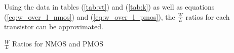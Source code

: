 \FloatBarrier

Using the data in tables (\ref{tab:vt}) and (\ref{tab:k}) as well as equations (\ref{eq:w_over_l_nmos}) and (\ref{eq:w_over_l_pmos}), the $\frac{W}{L}$ ratios for each transistor can be approximated.

\FloatBarrier

\begin{table}[h!]
	\centering
	\caption{$\frac{W}{L}$ Ratios for NMOS and PMOS}
	\label{tab:w_over_l}
\end{table}

\FloatBarrier
